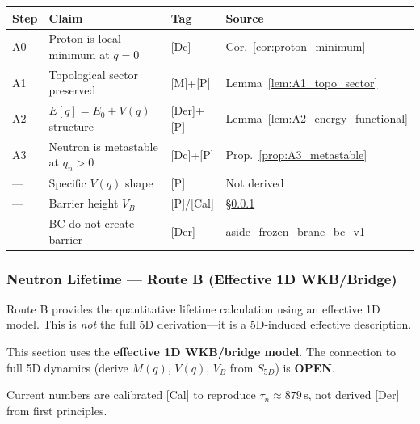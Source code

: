 \begin{center}
\begin{tabular}{llll}
\toprule
\textbf{Step} & \textbf{Claim} & \textbf{Tag} & \textbf{Source} \\
\midrule
A0 & Proton is local minimum at $q=0$ & [Dc] & Cor.~\ref{cor:proton_minimum} \\
A1 & Topological sector preserved & [M]+[P] & Lemma~\ref{lem:A1_topo_sector} \\
A2 & $E[q] = E_0 + V(q)$ structure & [Der]+[P] & Lemma~\ref{lem:A2_energy_functional} \\
A3 & Neutron is metastable at $q_n > 0$ & [Dc]+[P] & Prop.~\ref{prop:A3_metastable} \\
\midrule
--- & Specific $V(q)$ shape & [P] & Not derived \\
--- & Barrier height $V_B$ & [P]/[Cal] & \S\ref{subsec:neutron_routeB_wkb} \\
--- & BC do not create barrier & [Der] & aside\_frozen\_brane\_bc\_v1 \\
\bottomrule
\end{tabular}
\end{center}


\subsubsection{Neutron Lifetime --- Route B (Effective 1D WKB/Bridge)}
\label{subsec:neutron_routeB_wkb}

Route B provides the quantitative lifetime calculation using an effective 1D model.
This is \emph{not} the full 5D derivation---it is a 5D-induced effective description.

\begin{tcolorbox}[colback=red!5!white, colframe=red!50!black,
                  title={\textbf{Forensic Audit Declaration}}]
This section uses the \textbf{effective 1D WKB/bridge model}. The connection to full 5D
dynamics (derive $M(q)$, $V(q)$, $V_B$ from $S_{5D}$) is \textbf{OPEN}.

Current numbers are calibrated [Cal] to reproduce $\tau_n \approx 879\,\mathrm{s}$,
not derived [Der] from first principles.
\end{tcolorbox}


